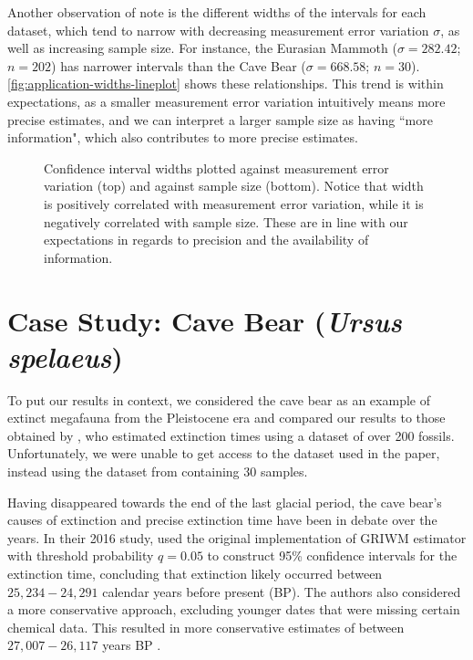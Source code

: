 Another observation of note is the different widths of the intervals for each dataset, which tend to narrow with decreasing measurement error variation $\sigma$, as well as increasing sample size. For instance, the Eurasian Mammoth ($\sigma = 282.42$; $n = 202$) has narrower intervals than the Cave Bear ($\sigma = 668.58$; $n = 30$). \autoref{fig:application-widths-lineplot} shows these relationships. This trend is within expectations, as a smaller measurement error variation intuitively means more precise estimates, and we can interpret a larger sample size as having ``more information", which also contributes to more precise estimates.
\begin{figure}[ht]
    \centering
    
    \caption{Confidence interval widths plotted against measurement error variation (top) and against sample size (bottom). Notice that width is positively correlated with measurement error variation, while it is negatively correlated with sample size. These are in line with our expectations in regards to precision and the availability of information.}
    \label{fig:application-widths-lineplot}
\end{figure}

\section{Case Study: Cave Bear (\textit{Ursus spelaeus})}

To put our results in context, we considered the cave bear as an example of extinct megafauna from the Pleistocene era and compared our results to those obtained by \citet{Baca2016}, who estimated extinction times using a dataset of over 200 fossils. Unfortunately, we were unable to get access to the dataset used in the paper, instead using the dataset from \citet{Cooper2015} containing 30 samples.

Having disappeared towards the end of the last glacial period, the cave bear's causes of extinction and precise extinction time have been in debate over the years. In their 2016 study, \citet{Baca2016} used the original implementation of GRIWM estimator with threshold probability $q = 0.05$ to construct 95\% confidence intervals for the extinction time, concluding that extinction likely occurred between $25,234 - 24,291$ calendar years before present (BP). The authors also considered a more conservative approach, excluding younger dates that were missing certain chemical data. This resulted in more conservative estimates of between $27,007 - 26,117$ years BP \cite{Baca2016}.

